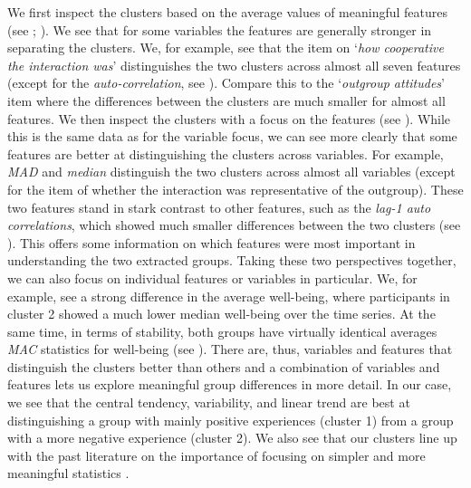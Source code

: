 We first inspect the clusters based on the average values of meaningful
features (see ; \citealp{Kennedy2021}). We
see that for some variables the features are generally stronger in
separating the clusters. We, for example, see that the item on
`\textit{how cooperative the interaction was}' distinguishes the two
clusters across almost all seven features (except for the
\textit{auto-correlation}, see ). Compare
this to the `\textit{outgroup attitudes}' item where the differences
between the clusters are much smaller for almost all features. We then
inspect the clusters with a focus on the features (see
). While this is the same data as for the
variable focus, we can see more clearly that some features are better at
distinguishing the clusters across variables. For example, \textit{MAD}
and \textit{median} distinguish the two clusters across almost all
variables (except for the item of whether the interaction was
representative of the outgroup). These two features stand in stark
contrast to other features, such as the
\textit{lag-1 auto correlations}, which showed much smaller differences
between the two clusters (see ). This
offers some information on which features were most important in
understanding the two extracted groups. Taking these two perspectives
together, we can also focus on individual features or variables in
particular. We, for example, see a strong difference in the average
well-being, where participants in cluster 2 showed a much lower median
well-being over the time series. At the same time, in terms of
stability, both groups have virtually identical averages \textit{MAC}
statistics for well-being (see ). There
are, thus, variables and features that distinguish the clusters better
than others and a combination of variables and features lets us explore
meaningful group differences in more detail. In our case, we see that
the central tendency, variability, and linear trend are best at
distinguishing a group with mainly positive experiences (cluster 1) from
a group with a more negative experience (cluster 2). We also see that
our clusters line up with the past literature on the importance of
focusing on simpler and more meaningful statistics
\citep{bringmann2018c, eronen2021a}.

